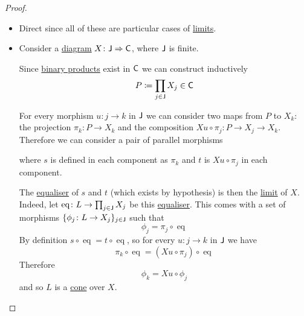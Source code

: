 \documentclass[../../main]{subfiles}
\begin{document}
\begin{proof}~
  \begin{itemize}
    \item[\(\implies\)] Direct since all of these are particular cases of \hyperref[def:categorical-limit]{limits}.
    \item[\(\impliedby\)] Consider a \hyperref[def:diagram]{diagram} \(X\colon \mathsf{J} \Rightarrow \mathsf{C}\), where \(\mathsf{J}\) is finite.

          Since \hyperref[def:categorical-product]{binary products} exist in \(\mathsf{C}\) we can construct inductively 
          \begin{equation*}
            P \coloneq \prod_{j \in \mathsf{J}} X_{j} \in \mathsf{C}
          \end{equation*}

          For every morphism \(u\colon j \to k\) in \(\mathsf{J}\) we can consider two maps from \(P\) to \(X_{k}\): the projection \(\pi_{k}\colon P \to X_{k}\) and the composition \(Xu \circ \pi_{j}\colon P \to X_{j} \to X_{k}\).
          Therefore we can consider a pair of parallel morphisms
          \begin{center}
          \end{center}
          where \(s\) is defined in each component as \(\pi_{k}\) and \(t\) is \(Xu \circ \pi_{j}\) in each component.

          The \hyperref[def:equaliser]{equaliser} of \(s\) and \(t\) (which exists by hypothesis) is then the \hyperref[def:categorical-limit]{limit} of \(X\).
          Indeed, let \(\operatorname{eq}\colon L \to \prod_{j \in \mathsf{J}} X_{j}\) be this \hyperref[def:equaliser]{equaliser}.
          This comes with a set of morphisms \(\{\phi_{j}\colon L \to X_{j}\}_{j \in \mathsf{J}}\) such that
          \begin{equation*}
            \phi_{j} = \pi_{j} \circ \operatorname{eq}
          \end{equation*}
          By definition \(s \circ \operatorname{eq} = t \circ \operatorname{eq}\), so for every \(u\colon j \to k\) in \(\mathsf{J}\) we have
          \begin{equation*}
            \pi_{k} \circ \operatorname{eq} = (Xu \circ \pi_{j}) \circ \operatorname{eq}
          \end{equation*}
          Therefore
          \begin{equation*}
            \phi_{k} = Xu \circ \phi_{j}
          \end{equation*}
          and so \(L\) is a \hyperref[def:cone]{cone} over \(X\).


\end{itemize}
\end{proof}
\end{document}
